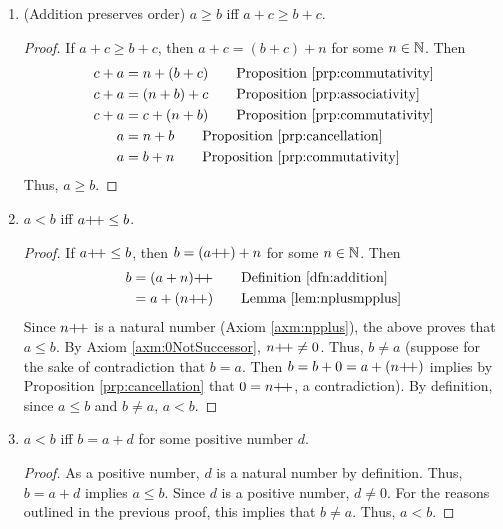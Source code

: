 \documentclass[../main.tex]{subfiles}
\begin{document}
\begin{enumerate}[ref={\thesection.\arabic*}]
\begin{prop}
\begin{enumerate}[label={\textup{(}\alph*\textup{)}}]
\begin{proof}
            \end{proof}
            \item \textup{(}Addition preserves order\textup{)} $a\geq b$ iff $a+c\geq b+c$.
            \begin{proof}
                If $a+c\geq b+c$, then $a+c=(b+c)+n$ for some $n\in\mathbb{N}$. Then
                \begin{align*}
                    c+a &= n+(b+c)\tag*{Proposition \ref{prp:commutativity}}\\
                    c+a &= (n+b)+c\tag*{Proposition \ref{prp:associativity}}\\
                    c+a &= c+(n+b)\tag*{Proposition \ref{prp:commutativity}}\\
                    a &= n+b\tag*{Proposition \ref{prp:cancellation}}\\
                    a &= b+n\tag*{Proposition \ref{prp:commutativity}}\\
                \end{align*}
                Thus, $a\geq b$.
            \end{proof}
            \item $a<b$ iff $a{+\!+}\leq b$.
            \begin{proof}
                If $a{+\!+}\leq b$, then $b=(a{+\!+})+n$ for some $n\in\mathbb{N}$. Then
                \begin{align*}
                    b &= (a+n)\pplus\tag*{Definition \ref{dfn:addition}}\\
                    &= a+(n\pplus)\tag*{Lemma \ref{lem:nplusmpplus}}
                \end{align*}
                Since $n{+\!+}$ is a natural number (Axiom \ref{axm:npplus}), the above proves that $a\leq b$. By Axiom \ref{axm:0NotSuccessor}, $n{+\!+}\neq 0$. Thus, $b\neq a$ (suppose for the sake of contradiction that $b=a$. Then $b=b+0=a+(n{+\!+})$ implies by Proposition \ref{prp:cancellation} that $0=n{+\!+}$, a contradiction). By definition, since $a\leq b$ and $b\neq a$, $a<b$.
            \end{proof}
            \item $a<b$ iff $b=a+d$ for some positive number $d$.
            \begin{proof}
                As a positive number, $d$ is a natural number by definition. Thus, $b=a+d$ implies $a\leq b$. Since $d$ is a positive number, $d\neq 0$. For the reasons outlined in the previous proof, this implies that $b\neq a$. Thus, $a<b$.
            \end{proof}

\end{enumerate}
\end{prop}
\end{enumerate}
\end{document}
